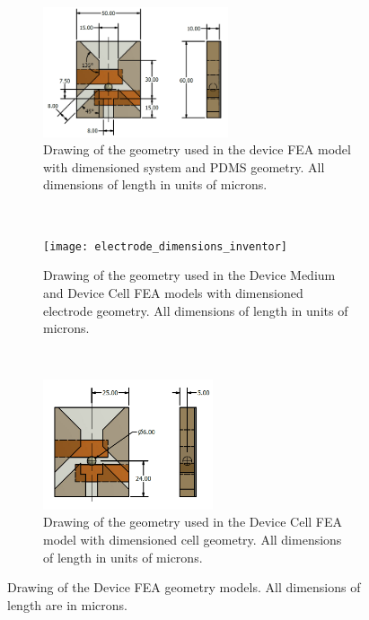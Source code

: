  \begin{figure}[H]
    \centering
    \begin{subfigure}[b]{\textwidth}
      \centering
    \includegraphics[width=0.6\textwidth]{images/channel_dimensions_inventor.png}
    \caption[]{Drawing of the geometry used in the device FEA model with dimensioned system and PDMS geometry. All dimensions of length in units of microns.}
    \label{fig:device_channel_dimensions_FEA}
    \end{subfigure}
    \\
    \vspace{0.1 in}
    \begin{subfigure}[b]{\textwidth}
        \centering
        \texttt{[image: electrode\_dimensions\_inventor]}
       \caption{Drawing of the geometry used in the Device Medium and Device Cell FEA models with dimensioned electrode geometry. All dimensions of length in units of microns.}
        \label{fig:device_electrode_dimensions_FEA}
    \end{subfigure} 
    \\
    \vspace{0.1 in}
    \begin{subfigure}[b]{\textwidth}
        \centering
        \includegraphics[width=0.55\textwidth]{images/particle_dimension_inventor.png}
        \caption{Drawing of the geometry used in the Device Cell FEA model with dimensioned cell geometry. All dimensions of length in units of microns.}
        \label{fig:device_cell_dimensions_FEA}
    \end{subfigure} 
    \caption[Device FEA model geometry.]{Drawing of the Device FEA geometry models. All dimensions of length are in microns.}
    \label{fig: FEA_device_geometry}
 \end{figure}

